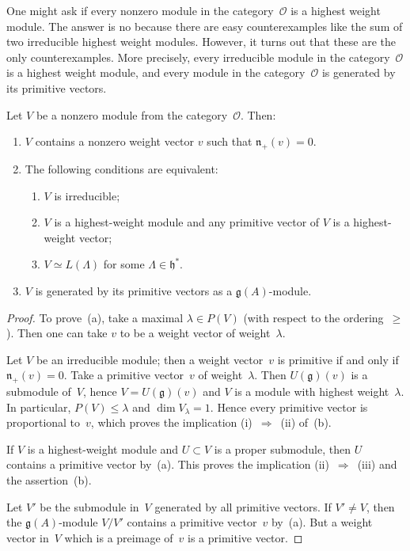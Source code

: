 \documentclass[12pt]{article}
\begin{document}
One might ask if every nonzero module in the category~$\mathcal{O}$ is a highest weight module. The answer is no because there are easy counterexamples like the sum of two irreducible highest weight modules. However, it turns out that these are the only counterexamples. More precisely, every irreducible module in the category~$\mathcal{O}$ is a highest weight module, and every module in the category~$\mathcal{O}$ is generated by its primitive vectors. 
\begin{proposition}[9.3]
Let $V$ be a nonzero module from the category~$\mathcal{O}$. Then:
\begin{enumerate}[label=\textup{(\alph*)}]
  \item $V$ contains a nonzero weight vector $v$ such that $\mathfrak{n}_+(v)=0$.
  \item The following conditions are equivalent:
  \begin{enumerate}[label=\textup{(\roman*)}]
    \item $V$ is irreducible;
    \item $V$ is a highest-weight module and any primitive vector of $V$ 
          is a highest-weight vector;
    \item $V \simeq L(\Lambda)$ for some $\Lambda \in \mathfrak{h}^*$.
  \end{enumerate}
  \item $V$ is generated by its primitive vectors as a $\mathfrak{g}(A)$-module.
\end{enumerate}

\begin{proof}
To prove~(a), take a maximal $\lambda \in P(V)$ (with respect to the ordering~$\ge$).
Then one can take $v$ to be a weight vector of weight~$\lambda$.

Let $V$ be an irreducible module; then a weight vector~$v$ is primitive if and only if
$\mathfrak{n}_+(v)=0$.  Take a primitive vector~$v$ of weight~$\lambda$.  
Then $U(\mathfrak{g})(v)$ is a submodule of~$V$, hence 
$V = U(\mathfrak{g})(v)$ and $V$ is a module with highest weight~$\lambda$.
In particular, $P(V) \le \lambda$ and $\dim V_\lambda = 1$.  
Hence every primitive vector is proportional to~$v$, which proves the implication
\textup{(i)}~$\Rightarrow$~\textup{(ii)} of~(b).

If $V$ is a highest-weight module and $U \subset V$ is a proper submodule, 
then $U$ contains a primitive vector by~(a).  
This proves the implication \textup{(ii)}~$\Rightarrow$~\textup{(iii)} and the assertion~(b).

Let $V'$ be the submodule in~$V$ generated by all primitive vectors.  
If $V' \ne V$, then the $\mathfrak{g}(A)$-module $V/V'$ contains a primitive vector~$v$ by~(a).
But a weight vector in~$V$ which is a preimage of~$v$ is a primitive vector.
\end{proof}
\end{proposition}
\end{document}
